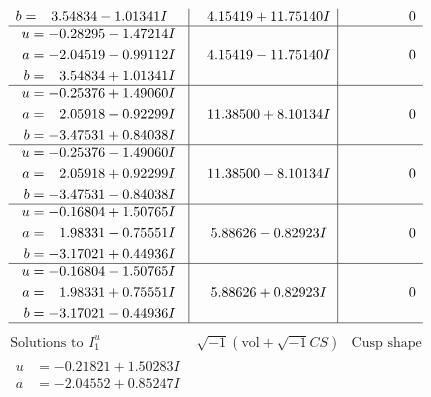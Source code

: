 \documentclass[1p]{elsarticle_modified}
\theoremstyle{definition}
\newcommand{\I}{\sqrt{-1}}
\begin{document}
$$\begin{array}{c|c|c}
\begin{aligned}
b &= \phantom{-}3.54834 - 1.01341 I\end{aligned}
 & \phantom{-}4.15419 + 11.75140 I & \phantom{-0.000000 } 0 \\ \hline\begin{aligned}
u &= -0.28295 - 1.47214 I \\
a &= -2.04519 - 0.99112 I \\
b &= \phantom{-}3.54834 + 1.01341 I\end{aligned}
 & \phantom{-}4.15419 - 11.75140 I & \phantom{-0.000000 } 0 \\ \hline\begin{aligned}
u &= -0.25376 + 1.49060 I \\
a &= \phantom{-}2.05918 - 0.92299 I \\
b &= -3.47531 + 0.84038 I\end{aligned}
 & \phantom{-}11.38500 + 8.10134 I & \phantom{-0.000000 } 0 \\ \hline\begin{aligned}
u &= -0.25376 - 1.49060 I \\
a &= \phantom{-}2.05918 + 0.92299 I \\
b &= -3.47531 - 0.84038 I\end{aligned}
 & \phantom{-}11.38500 - 8.10134 I & \phantom{-0.000000 } 0 \\ \hline\begin{aligned}
u &= -0.16804 + 1.50765 I \\
a &= \phantom{-}1.98331 - 0.75551 I \\
b &= -3.17021 + 0.44936 I\end{aligned}
 & \phantom{-}5.88626 - 0.82923 I & \phantom{-0.000000 } 0 \\ \hline\begin{aligned}
u &= -0.16804 - 1.50765 I \\
a &= \phantom{-}1.98331 + 0.75551 I \\
b &= -3.17021 - 0.44936 I\end{aligned}
 & \phantom{-}5.88626 + 0.82923 I & \phantom{-0.000000 } 0\\
 \hline 
 \end{array}$$\newpage$$\begin{array}{c|c|c}  
\text{Solutions to }I^u_{1}& \I (\text{vol} + \sqrt{-1}CS) & \text{Cusp shape}\\
 \hline 
\begin{aligned}
u &= -0.21821 + 1.50283 I \\
a &= -2.04552 + 0.85247 I \\

\end{aligned}
\end{array}$$
\end{document}
